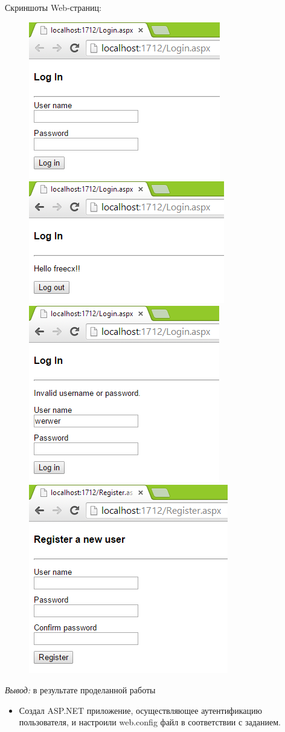 \documentclass[pscyr]{hedlab}
\begin{document}
    Скриншоты Web-страниц:
    \begin{figure}[h!]
        \center
        \includegraphics[width=.47\textwidth]{lab06_01} \hspace{1em}
        \includegraphics[width=.47\textwidth]{lab06_02} \\
        \includegraphics[width=.47\textwidth]{lab06_03} \hspace{1em}
        \includegraphics[width=.47\textwidth]{lab06_04}
    \end{figure}

    \emph{Вывод:} в результате проделанной работы
    \begin{itemize}
        \item Создал ASP.NET приложение, осуществляющее аутентификацию пользователя, и настроили 
            web.config файл в соответствии с заданием.
    \end{itemize}
\end{document}
